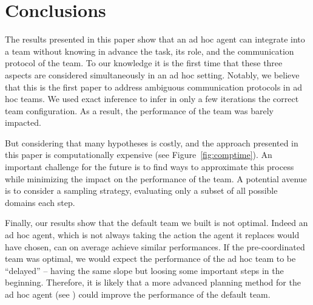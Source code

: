 \vspace{1em} %
\section{Conclusions}


The results presented in this paper show that an ad hoc agent can integrate into a team without knowing in advance the task, its role, and the communication protocol of the team. To our knowledge it is the first time that these three aspects are considered simultaneously in an ad hoc setting. Notably, we believe that this is the first paper to address ambiguous communication protocols in ad hoc teams. We used exact inference to infer in only a few iterations the correct team configuration. As a result, the performance of the team was barely impacted.

But considering that many hypotheses is costly, and the approach presented in this paper is computationally expensive (see Figure~\ref{fig:comptime}). An important challenge for the future is to find ways to approximate this process while minimizing the impact on the performance of the team. A potential avenue is to consider a sampling strategy, evaluating only a subset of all possible domains each step.

Finally, our results show that the default team we built is not optimal. Indeed an ad hoc agent, which is not always taking the action the agent it replaces would have chosen, can on average achieve similar performances. If the pre-coordinated team was optimal, we would expect the performance of the ad hoc team to be ``delayed'' -- having the same slope but loosing some important steps in the beginning. Therefore, it is likely that a more advanced planning method for the ad hoc agent (see \cite{barrett2011empirical}) could improve the performance of the default team.

